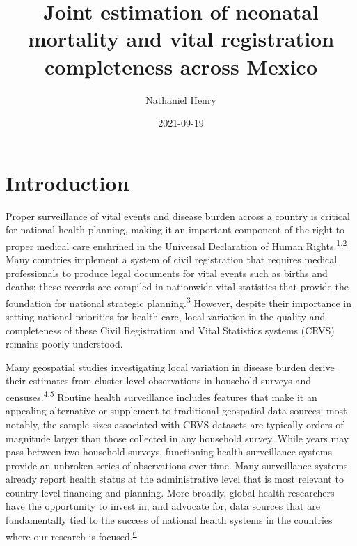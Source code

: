 \documentclass[
]{article}
\title{Joint estimation of neonatal mortality and vital registration completeness across Mexico}
\author{Nathaniel Henry\textsuperscript{}}
\date{2021-09-19}
\begin{document}
\maketitle

\hypertarget{introduction}{%
\section{Introduction}\label{introduction}}

Proper surveillance of vital events and disease burden across a country is critical for national health planning, making it an important component of the right to proper medical care enshrined in the Universal Declaration of Human Rights.\textsuperscript{\protect\hyperlink{ref-Setel2007}{1},\protect\hyperlink{ref-srs}{2}} Many countries implement a system of civil registration that requires medical professionals to produce legal documents for vital events such as births and deaths; these records are compiled in nationwide vital statistics that provide the foundation for national strategic planning.\textsuperscript{\protect\hyperlink{ref-Abouzahr2005}{3}} However, despite their importance in setting national priorities for health care, local variation in the quality and completeness of these Civil Registration and Vital Statistics systems (CRVS) remains poorly understood.

Many geospatial studies investigating local variation in disease burden derive their estimates from cluster-level observations in household surveys and censuses.\textsuperscript{\protect\hyperlink{ref-Diggle2016}{4},\protect\hyperlink{ref-Wakefield2020}{5}} Routine health surveillance includes features that make it an appealing alternative or supplement to traditional geospatial data sources: most notably, the sample sizes associated with CRVS datasets are typically orders of magnitude larger than those collected in any household survey. While years may pass between two household surveys, functioning health surveillance systems provide an unbroken series of observations over time. Many surveillance systems already report health status at the administrative level that is most relevant to country-level financing and planning. More broadly, global health researchers have the opportunity to invest in, and advocate for, data sources that are fundamentally tied to the success of national health systems in the countries where our research is focused.\textsuperscript{\protect\hyperlink{ref-AbouZahr2015}{6}}
\end{document}
